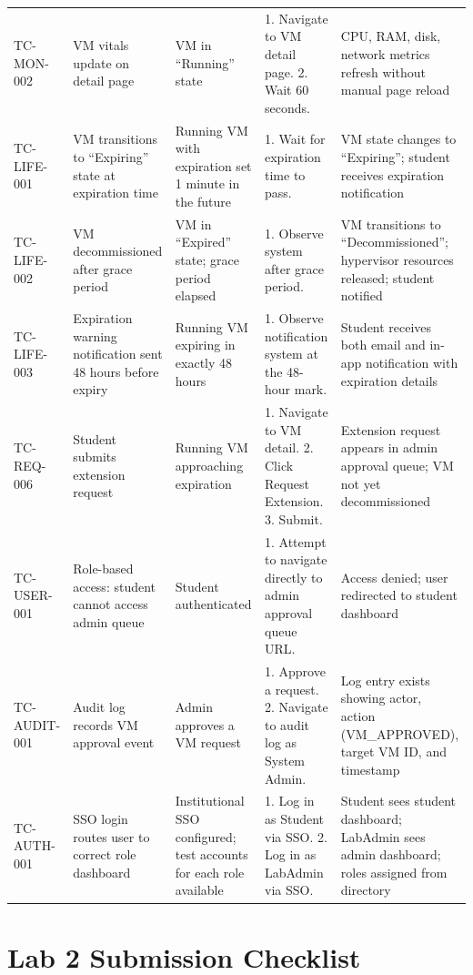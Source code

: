 \documentclass[12pt,letterpaper]{article}
\begin{document}
\begin{longtable}{L{2cm} L{3cm} L{3cm} L{3.5cm} L{3cm}}
  \addlinespace
  TC-MON-002 & VM vitals update on detail page & VM in ``Running'' state & 1. Navigate to VM detail page. 2. Wait 60 seconds. & CPU, RAM, disk, network metrics refresh without manual page reload \\
  \addlinespace
  TC-LIFE-001 & VM transitions to ``Expiring'' state at expiration time & Running VM with expiration set 1 minute in the future & 1. Wait for expiration time to pass. & VM state changes to ``Expiring''; student receives expiration notification \\
  \addlinespace
  TC-LIFE-002 & VM decommissioned after grace period & VM in ``Expired'' state; grace period elapsed & 1. Observe system after grace period. & VM transitions to ``Decommissioned''; hypervisor resources released; student notified \\
  \addlinespace
  TC-LIFE-003 & Expiration warning notification sent 48 hours before expiry & Running VM expiring in exactly 48 hours & 1. Observe notification system at the 48-hour mark. & Student receives both email and in-app notification with expiration details \\
  \addlinespace
  TC-REQ-006 & Student submits extension request & Running VM approaching expiration & 1. Navigate to VM detail. 2. Click Request Extension. 3. Submit. & Extension request appears in admin approval queue; VM not yet decommissioned \\
  \addlinespace
  TC-USER-001 & Role-based access: student cannot access admin queue & Student authenticated & 1. Attempt to navigate directly to admin approval queue URL. & Access denied; user redirected to student dashboard \\
  \addlinespace
  TC-AUDIT-001 & Audit log records VM approval event & Admin approves a VM request & 1. Approve a request. 2. Navigate to audit log as System Admin. & Log entry exists showing actor, action (VM\_APPROVED), target VM ID, and timestamp \\
  \addlinespace
  TC-AUTH-001 & SSO login routes user to correct role dashboard & Institutional SSO configured; test accounts for each role available & 1. Log in as Student via SSO. 2. Log in as LabAdmin via SSO. & Student sees student dashboard; LabAdmin sees admin dashboard; roles assigned from directory \\
\end{longtable}

\section{Lab 2 Submission Checklist}
\end{document}
